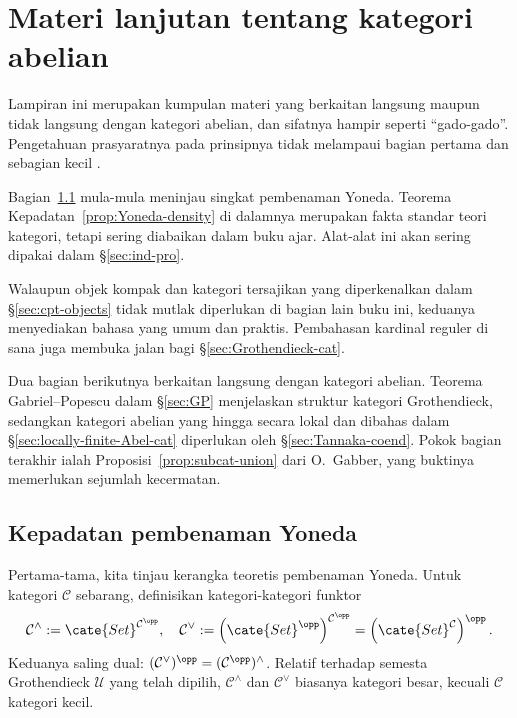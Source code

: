 
\chapter{Materi lanjutan tentang kategori abelian}\label{sec:app-Abel}
\hypertarget{o014.aljabr2.appendix1.yoneda-density}{ }
Lampiran ini merupakan kumpulan materi yang berkaitan langsung maupun tidak
langsung dengan kategori abelian, dan sifatnya hampir seperti ``gado-gado''.
Pengetahuan prasyaratnya pada prinsipnya tidak melampaui bagian pertama
 dan sebagian kecil .

Bagian~\ref{sec:Yoneda} mula-mula meninjau singkat pembenaman Yoneda.
Teorema Kepadatan~\ref{prop:Yoneda-density} di dalamnya merupakan fakta
standar teori kategori, tetapi sering diabaikan dalam buku ajar. Alat-alat
ini akan sering dipakai dalam \S\ref{sec:ind-pro}.

Walaupun objek kompak dan kategori tersajikan yang diperkenalkan dalam
\S\ref{sec:cpt-objects} tidak mutlak diperlukan di bagian lain buku ini,
keduanya menyediakan bahasa yang umum dan praktis. Pembahasan kardinal
reguler di sana juga membuka jalan bagi \S\ref{sec:Grothendieck-cat}.

Dua bagian berikutnya berkaitan langsung dengan kategori abelian. Teorema
Gabriel--Popescu dalam \S\ref{sec:GP} menjelaskan struktur kategori
Grothendieck, sedangkan kategori abelian yang hingga secara lokal dan dibahas dalam
\S\ref{sec:locally-finite-Abel-cat} diperlukan oleh
\S\ref{sec:Tannaka-coend}. Pokok bagian terakhir ialah
Proposisi~\ref{prop:subcat-union} dari O.\ Gabber, yang buktinya memerlukan
sejumlah kecermatan.

\section{Kepadatan pembenaman Yoneda}\label{sec:Yoneda}
Pertama-tama, kita tinjau kerangka teoretis pembenaman Yoneda. Untuk
kategori $\mathcal{C}$ sebarang, definisikan kategori-kategori funktor
\[ \mathcal{C}^\wedge := \cate{Set}^{\mathcal{C}^{\opp}}, \quad \mathcal{C}^\vee := \left(\cate{Set}^{\opp}\right)^{\mathcal{C}^{\opp}} = \left( \cate{Set}^{\mathcal{C}} \right)^{\opp}. \]
Keduanya saling dual:
$(\mathcal{C}^\vee)^{\opp}=(\mathcal{C}^{\opp})^\wedge$. Relatif terhadap
semesta Grothendieck $\mathcal{U}$ yang telah dipilih,
$\mathcal{C}^\wedge$ dan $\mathcal{C}^\vee$ biasanya kategori besar,
kecuali $\mathcal{C}$ kategori kecil.

